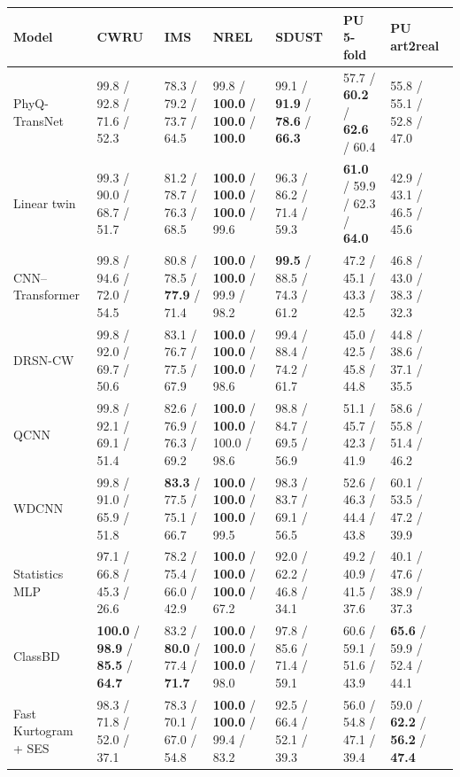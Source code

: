 \begin{tabular}{lllllll}
\toprule
Model & CWRU & IMS & NREL & SDUST & PU 5-fold & PU art2real \\
\midrule
PhyQ-TransNet & 99.8 / 92.8 / 71.6 / 52.3 & 78.3 / 79.2 / 73.7 / 64.5 & 99.8 / \textbf{100.0} / \textbf{100.0} / \textbf{100.0} & 99.1 / \textbf{91.9} / \textbf{78.6} / \textbf{66.3} & 57.7 / \textbf{60.2} / \textbf{62.6} / 60.4 & 55.8 / 55.1 / 52.8 / 47.0 \\
Linear twin & 99.3 / 90.0 / 68.7 / 51.7 & 81.2 / 78.7 / 76.3 / 68.5 & \textbf{100.0} / \textbf{100.0} / \textbf{100.0} / 99.6 & 96.3 / 86.2 / 71.4 / 59.3 & \textbf{61.0} / 59.9 / 62.3 / \textbf{64.0} & 42.9 / 43.1 / 46.5 / 45.6 \\
CNN--Transformer & 99.8 / 94.6 / 72.0 / 54.5 & 80.8 / 78.5 / \textbf{77.9} / 71.4 & \textbf{100.0} / \textbf{100.0} / 99.9 / 98.2 & \textbf{99.5} / 88.5 / 74.3 / 61.2 & 47.2 / 45.1 / 43.3 / 42.5 & 46.8 / 43.0 / 38.3 / 32.3 \\
DRSN-CW & 99.8 / 92.0 / 69.7 / 50.6 & 83.1 / 76.7 / 77.5 / 67.9 & \textbf{100.0} / \textbf{100.0} / \textbf{100.0} / 98.6 & 99.4 / 88.4 / 74.2 / 61.7 & 45.0 / 42.5 / 45.8 / 44.8 & 44.8 / 38.6 / 37.1 / 35.5 \\
QCNN & 99.8 / 92.1 / 69.1 / 51.4 & 82.6 / 76.9 / 76.3 / 69.2 & \textbf{100.0} / \textbf{100.0} / 100.0 / 98.6 & 98.8 / 84.7 / 69.5 / 56.9 & 51.1 / 45.7 / 42.3 / 41.9 & 58.6 / 55.8 / 51.4 / 46.2 \\
WDCNN & 99.8 / 91.0 / 65.9 / 51.8 & \textbf{83.3} / 77.5 / 75.1 / 66.7 & \textbf{100.0} / \textbf{100.0} / \textbf{100.0} / 99.5 & 98.3 / 83.7 / 69.1 / 56.5 & 52.6 / 46.3 / 44.4 / 43.8 & 60.1 / 53.5 / 47.2 / 39.9 \\
Statistics MLP & 97.1 / 66.8 / 45.3 / 26.6 & 78.2 / 75.4 / 66.0 / 42.9 & \textbf{100.0} / \textbf{100.0} / \textbf{100.0} / 67.2 & 92.0 / 62.2 / 46.8 / 34.1 & 49.2 / 40.9 / 41.5 / 37.6 & 40.1 / 47.6 / 38.9 / 37.3 \\
ClassBD & \textbf{100.0} / \textbf{98.9} / \textbf{85.5} / \textbf{64.7} & 83.2 / \textbf{80.0} / 77.4 / \textbf{71.7} & \textbf{100.0} / \textbf{100.0} / \textbf{100.0} / 98.0 & 97.8 / 85.6 / 71.4 / 59.1 & 60.6 / 59.1 / 51.6 / 43.9 & \textbf{65.6} / 59.9 / 52.4 / 44.1 \\
Fast Kurtogram + SES & 98.3 / 71.8 / 52.0 / 37.1 & 78.3 / 70.1 / 67.0 / 54.8 & \textbf{100.0} / \textbf{100.0} / 99.4 / 83.2 & 92.5 / 66.4 / 52.1 / 39.3 & 56.0 / 54.8 / 47.1 / 39.4 & 59.0 / \textbf{62.2} / \textbf{56.2} / \textbf{47.4} \\
\bottomrule
\end{tabular}